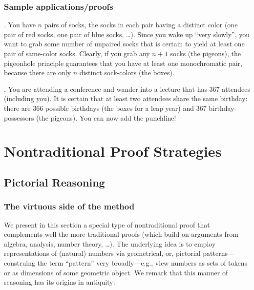 \subsubsection{Sample applications/proofs}
\label{sec:pigeon-apps}

.
You have $n$ pairs of socks, the socks in each pair having a distinct color (one pair of red socks, one pair of blue socks, \ldots).  Since you wake up ``very slowly'', you want to grab some number of unpaired socks that is certain to yield at least one pair of same-color socks.  Clearly, if you grab any $n+1$ socks (the pigeons), the pigeonhole principle guarantees that you have at least one monochromatic pair, because there are only $n$ distinct sock-colors (the boxes).

\medskip

.
You are attending a conference and wander into a lecture that has 367 attendees (including you).  It is certain that at least two attendees share the same birthday: there are 366 possible birthdays (the boxes for a leap year) and 367 birthday-possessors (the pigeons).  You can now add the punchline!




\section{Nontraditional Proof Strategies}
\label{sec:nontraditionalProofs}

\subsection{Pictorial Reasoning}
\label{sec:graphicalproofs}

\subsubsection{The virtuous side of the method}

We present in this section a special type of nontraditional proof that complements well the more traditional proofs (which build on arguments from algebra, analysis, number theory, \ldots).  The underlying idea is to employ representations of (natural) numbers via geometrical, or, pictorial
patterns---construing the term ``pattern'' very broadly---e.g., view numbers as sets of tokens or as dimensions of some geometric object.  We remark that this manner of reasoning has its origins in antiquity:

